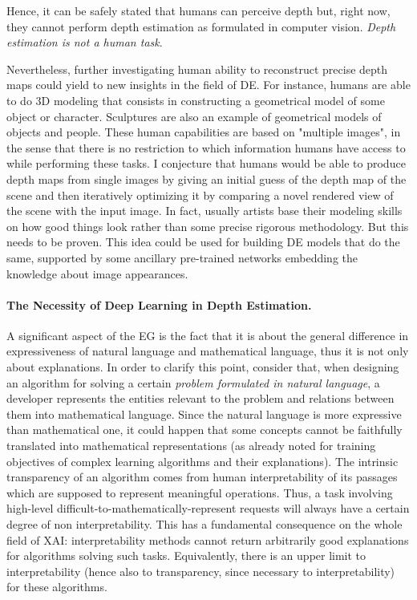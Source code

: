 Hence, it can be safely stated that humans can perceive depth but, right now, they cannot perform depth estimation as formulated in computer vision.
\textit{Depth estimation is not a human task}.

Nevertheless, further investigating human ability to reconstruct precise depth maps could yield to new insights in the field of DE.
For instance, humans are able to do 3D modeling that consists in constructing a geometrical model of some object or character.
Sculptures are also an example of geometrical models of objects and people.
These human capabilities are based on "multiple images", in the sense that there is no restriction to which information humans have access to while performing these tasks.
I conjecture that humans would be able to produce depth maps from single images by giving an initial guess of the depth map of the scene and then iteratively optimizing it by comparing a novel rendered view of the scene with the input image.
In fact, usually artists base their modeling skills on how good things look rather than some precise rigorous methodology.
But this needs to be proven.
This idea could be used for building DE models that do the same, supported by some ancillary pre-trained networks embedding the knowledge about image appearances.

\vfill

\paragraph{The Necessity of Deep Learning in Depth Estimation.}
A significant aspect of the EG is the fact that it is about the general difference in expressiveness of natural language and mathematical language, thus it is not only about explanations.
In order to clarify this point, consider that, when designing an algorithm for solving a certain \textit{problem formulated in natural language}, a developer represents the entities relevant to the problem and relations between them into mathematical language.
Since the natural language is more expressive than mathematical one, it could happen that some concepts cannot be faithfully translated into mathematical representations (as already noted for training objectives of complex learning algorithms and their explanations).
The intrinsic transparency of an algorithm comes from human interpretability of its passages which are supposed to represent meaningful operations.
Thus, a task involving high-level difficult-to-mathematically-represent requests will always have a certain degree of non interpretability.
This has a fundamental consequence on the whole field of XAI: interpretability methods cannot return arbitrarily good explanations for algorithms solving such tasks.
Equivalently, there is an upper limit to interpretability (hence also to transparency, since necessary to interpretability) for these algorithms.

